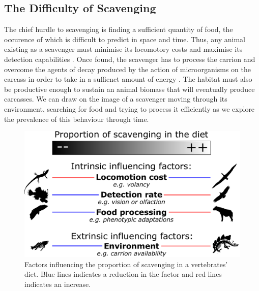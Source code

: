 \documentclass[a4paper,12pt]{article}
\begin{document}
\subsection*{The Difficulty of Scavenging} %
The chief hurdle to scavenging is finding a sufficient quantity of food, the occurence of which is difficult to predict in space and time. Thus, any animal existing as a scavenger must minimise its locomotory costs and maximise its detection capabilities \citep{ruxton2004obligate}.
Once found, the scavenger has to process the carrion and overcome the agents of decay produced by the action of microorganisms on the carcass in order to take in a suffienct amount of energy \citep{ruxton2014fruit}. 
The habitat must also be productive enough to sustain an animal biomass that will eventually produce carcasses.
We can draw on the image of a scavenger moving through its environment, searching for food and trying to process it efficiently as we explore the prevalence of this behaviour through time. 

\begin{figure}[!htbp]
\centering
   \includegraphics[width=1\textwidth]{Summary_figure/Summary_figure_Landscape.pdf}
\caption{Factors influencing the proportion of scavenging in a vertebrates' diet. Blue lines indicates a reduction in the factor and red lines indicates an increase.}
\label{Summary_figure}
\end{figure}


\end{document}
